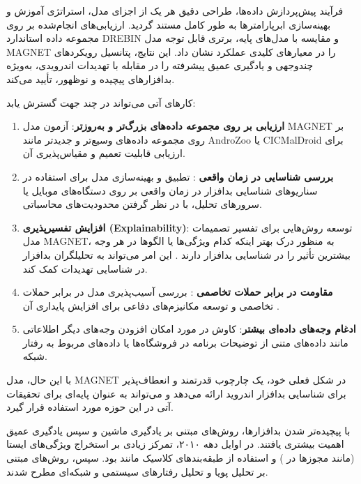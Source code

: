 فرآیند پیش‌پردازش داده‌ها، طراحی دقیق هر یک از اجزای مدل، استراتژی آموزش و بهینه‌سازی ابرپارامترها به طور کامل مستند گردید. ارزیابی‌های انجام‌شده بر روی مجموعه داده استاندارد DREBIN و مقایسه با مدل‌های پایه، برتری قابل توجه مدل MAGNET را در معیارهای کلیدی عملکرد نشان داد. این نتایج، پتانسیل رویکردهای چندوجهی و یادگیری عمیق پیشرفته را در مقابله با تهدیدات اندرویدی، به‌ویژه بدافزارهای پیچیده و نوظهور، تأیید می‌کند.

کارهای آتی می‌تواند در چند جهت گسترش یابد:
\begin{enumerate}
    \item \textbf{ارزیابی بر روی مجموعه داده‌های بزرگ‌تر و به‌روزتر}: آزمون مدل MAGNET بر روی مجموعه داده‌های وسیع‌تر و جدیدتر مانند AndroZoo \citep{Allix2016} یا CICMalDroid \citep{CICMalDroid} برای ارزیابی قابلیت تعمیم و مقیاس‌پذیری آن.
    \item \textbf{بررسی شناسایی در زمان واقعی }: تطبیق و بهینه‌سازی مدل برای استفاده در سناریوهای شناسایی بدافزار در زمان واقعی بر روی دستگاه‌های موبایل یا سرورهای تحلیل، با در نظر گرفتن محدودیت‌های محاسباتی.
    \item \textbf{افزایش تفسیرپذیری (Explainability)}: توسعه روش‌هایی برای تفسیر تصمیمات مدل MAGNET، به منظور درک بهتر اینکه کدام ویژگی‌ها یا الگوها در هر وجه بیشترین تأثیر را در شناسایی بدافزار دارند \citep{Marastoni2022}. این امر می‌تواند به تحلیلگران بدافزار در شناسایی تهدیدات کمک کند.
    \item \textbf{مقاومت در برابر حملات تخاصمی }: بررسی آسیب‌پذیری مدل در برابر حملات تخاصمی و توسعه مکانیزم‌های دفاعی برای افزایش پایداری آن \citep{Demontis2017}.
    \item \textbf{ادغام وجه‌های داده‌ای بیشتر}: کاوش در مورد امکان افزودن وجه‌های دیگر اطلاعاتی مانند داده‌های متنی از توضیحات برنامه در فروشگاه‌ها یا داده‌های مربوط به رفتار شبکه.
\end{enumerate}

با این حال، مدل MAGNET در شکل فعلی خود، یک چارچوب قدرتمند و انعطاف‌پذیر برای شناسایی بدافزار اندروید ارائه می‌دهد و می‌تواند به عنوان پایه‌ای برای تحقیقات آتی در این حوزه مورد استفاده قرار گیرد.

با پیچیده‌تر شدن بدافزارها، روش‌های مبتنی بر یادگیری ماشین و سپس یادگیری عمیق اهمیت بیشتری یافتند. در اوایل دهه ۲۰۱۰، تمرکز زیادی بر استخراج ویژگی‌های ایستا (مانند مجوزها در  \cite{Drebin}) و استفاده از طبقه‌بندهای کلاسیک مانند  بود. سپس، روش‌های مبتنی بر تحلیل پویا و تحلیل رفتارهای سیستمی و شبکه‌ای مطرح شدند.

